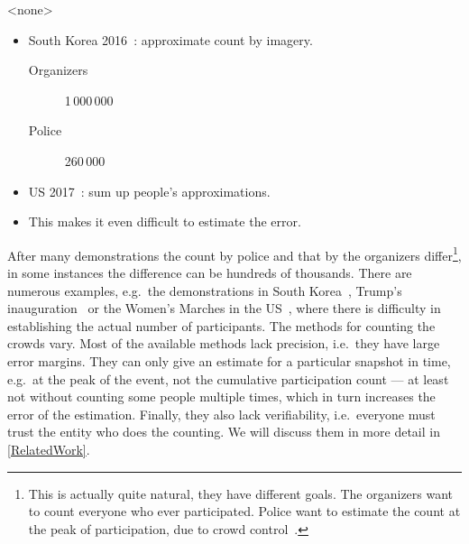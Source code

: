 \mode<none>{%
\begin{frame}
  \begin{example}
    \begin{itemize}
      \item South Korea 2016~\cite{2016DemonstrationsInSeoul}:
        approximate count by imagery.
        \begin{description}
          \item[Organizers] 1\,000\,000
          \item[Police] 260\,000
        \end{description}

        \pause{}

      \item US 2017~\cite{2017WomensMarchesInUS}:
        sum up people's approximations.
      \item This makes it even difficult to estimate the error.
    \end{itemize}
  \end{example}
\end{frame}
}

After many demonstrations the count by police and that by the organizers 
differ\footnote{%
  This is actually quite natural, they have different goals.
  The organizers want to count everyone who ever participated.
  Police want to estimate the count at the peak of participation, due to crowd 
  control~\cite{2016DemonstrationsInSeoul}.
}, in some instances the difference can be hundreds of thousands.
There are numerous examples, e.g.\ the demonstrations in South 
Korea~\cite{2016DemonstrationsInSeoul}, Trump's 
inauguration~\cite{HowWillWeKnowTrumpInauguralCrowdSize} or the Women's Marches 
in the US~\cite{2017WomensMarchesInUS}, where there is difficulty in 
establishing the actual number of participants.
The methods for counting the crowds vary.
Most of the available methods lack precision, i.e.\ they have large error 
margins.
They can only give an estimate for a particular snapshot in time, e.g.\ at the 
peak of the event, not the cumulative participation count --- at least not 
without counting some people multiple times, which in turn increases the error 
of the estimation.
Finally, they also lack verifiability, i.e.\ everyone must trust the entity who
does the counting.
We will discuss them in more detail in \cref{RelatedWork}.


